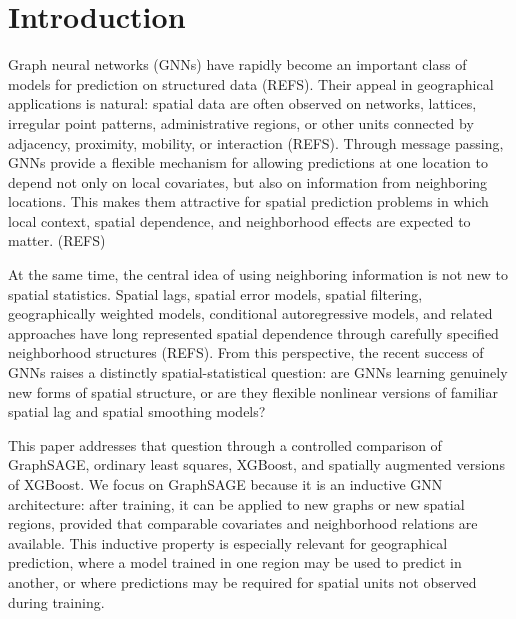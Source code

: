 \documentclass[ASNA, twocolumn]{USG} %
\begin{document}

\maketitle


\section{Introduction}
\label{sec:intro}

Graph neural networks (GNNs) have rapidly become an important class of models for prediction on structured data (REFS). Their appeal in geographical applications is natural: spatial data are often observed on networks, lattices, irregular point patterns, administrative regions, or other units connected by adjacency, proximity, mobility, or interaction (REFS). Through message passing, GNNs provide a flexible mechanism for allowing predictions at one location to depend not only on local covariates, but also on information from neighboring locations. This makes them attractive for spatial prediction problems in which local context, spatial dependence, and neighborhood effects are expected to matter. (REFS)

At the same time, the central idea of using neighboring information is not new to spatial statistics. Spatial lags, spatial error models, spatial filtering, geographically weighted models, conditional autoregressive models, and related approaches have long represented spatial dependence through carefully specified neighborhood structures (REFS). From this perspective, the recent success of GNNs raises a distinctly spatial-statistical question: are GNNs learning genuinely new forms of spatial structure, or are they flexible nonlinear versions of familiar spatial lag and spatial smoothing models?

This paper addresses that question through a controlled comparison of GraphSAGE, ordinary least squares, XGBoost, and spatially augmented versions of XGBoost. We focus on GraphSAGE because it is an inductive GNN architecture: after training, it can be applied to new graphs or new spatial regions, provided that comparable covariates and neighborhood relations are available. This inductive property is especially relevant for geographical prediction, where a model trained in one region may be used to predict in another, or where predictions may be required for spatial units not observed during training.
\end{document}
